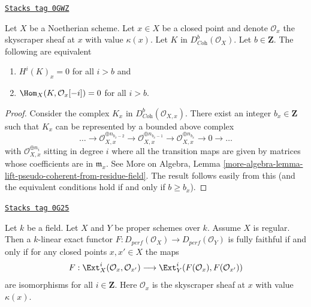 \begin{lemma}
\label{equiv-lemma-hom-into-point-sheaf}
\href{https://stacks.math.columbia.edu/tag/0GWZ}{\texttt{Stacks tag 0GWZ}}

Let $X$ be a Noetherian scheme. Let $x \in X$ be a closed point and
denote $\mathcal{O}_x$ the skyscraper sheaf at $x$ with value $\kappa(x)$.
Let $K$ in $D^b_{\textit{Coh}}(\mathcal{O}_X)$. Let $b \in \mathbf{Z}$.
The following are equivalent
\begin{enumerate}
\item $H^i(K)_x = 0$ for all $i > b$ and
\item $\Hom_X(K, \mathcal{O}_x[-i]) = 0$ for all $i > b$.
\end{enumerate}
\end{lemma}

\begin{proof}
Consider the complex $K_x$ in $D^b_{\textit{Coh}}(\mathcal{O}_{X, x})$.
There exist an integer $b_x \in \mathbf{Z}$ such that $K_x$
can be represented by a bounded above complex
$$
\ldots \to
\mathcal{O}_{X, x}^{\oplus n_{b_x - 2}} \to
\mathcal{O}_{X, x}^{\oplus n_{b_x - 1}} \to
\mathcal{O}_{X, x}^{\oplus n_{b_x}} \to 0 \to \ldots
$$
with $\mathcal{O}_{X, x}^{\oplus n_i}$ sitting in degree $i$
where all the transition maps are given by matrices whose
coefficients are in $\mathfrak m_x$. See
More on Algebra, Lemma
\ref{more-algebra-lemma-lift-pseudo-coherent-from-residue-field}.
The result follows easily from this (and the equivalent
conditions hold if and only if $b \geq b_x$).
\end{proof}

\begin{lemma}
\label{equiv-lemma-get-fully-faithful-geometric}
\href{https://stacks.math.columbia.edu/tag/0G25}{\texttt{Stacks tag 0G25}}

Let $k$ be a field. Let $X$ and $Y$ be proper schemes over $k$.
Assume $X$ is regular. Then a $k$-linear exact functor
$F : D_{perf}(\mathcal{O}_X) \to D_{perf}(\mathcal{O}_Y)$
is fully faithful if and only if
for any closed points $x, x' \in X$ the maps
$$
F : \Ext^i_X(\mathcal{O}_x, \mathcal{O}_{x'})
\longrightarrow
\Ext^i_Y(F(\mathcal{O}_x), F(\mathcal{O}_{x'}))
$$
are isomorphisms for all $i \in \mathbf{Z}$.
Here $\mathcal{O}_x$ is the skyscraper sheaf at $x$ with value $\kappa(x)$.
\end{lemma}


